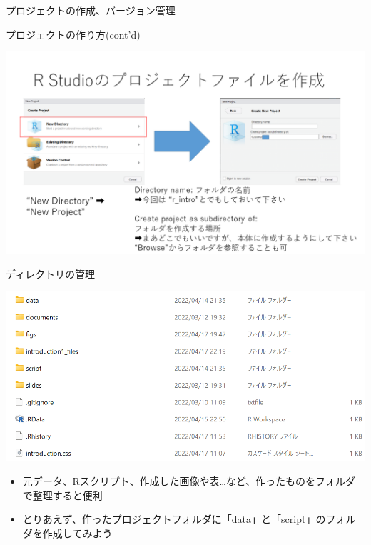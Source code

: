 \documentclass[
  ignorenonframetext,
]{beamer}
\providecommand{\tightlist}{%
  \setlength{\itemsep}{0pt}\setlength{\parskip}{0pt}}
\begin{document}
\begin{frame}[fragile]{プロジェクトの作成、バージョン管理}
\begin{block}{プロジェクトの作り方(cont'd)}
\protect\hypertarget{ux30d7ux30edux30b8ux30a7ux30afux30c8ux306eux4f5cux308aux65b9contd}{}
\begin{center}\includegraphics[width=0.95\linewidth]{figs/create_repository2} \end{center}
\end{block}

\begin{block}{ディレクトリの管理}
\protect\hypertarget{ux30c7ux30a3ux30ecux30afux30c8ux30eaux306eux7ba1ux7406}{}
\begin{center}\includegraphics[width=0.95\linewidth]{figs/directory_example} \end{center}

\begin{itemize}
\tightlist
\item
  元データ、Rスクリプト、作成した画像や表\ldots など、作ったものをフォルダで整理すると便利
\item
  とりあえず、作ったプロジェクトフォルダに「data」と「script」のフォルダを作成してみよう
\end{itemize}
\end{block}
\end{frame}
\end{document}
